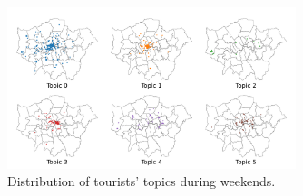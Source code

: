 \documentclass{article}
\theoremstyle{definition}
\theoremstyle{remark}
\begin{document}
\begin{figure}[!h]
\centering
\includegraphics[width=0.75\textwidth]{figures/topics_distribution_weekend_tourists.png}
\caption{\label{fig:topics_distribution_weekend_tourists}Distribution of tourists' topics during weekends.}
\end{figure}
\end{document}
